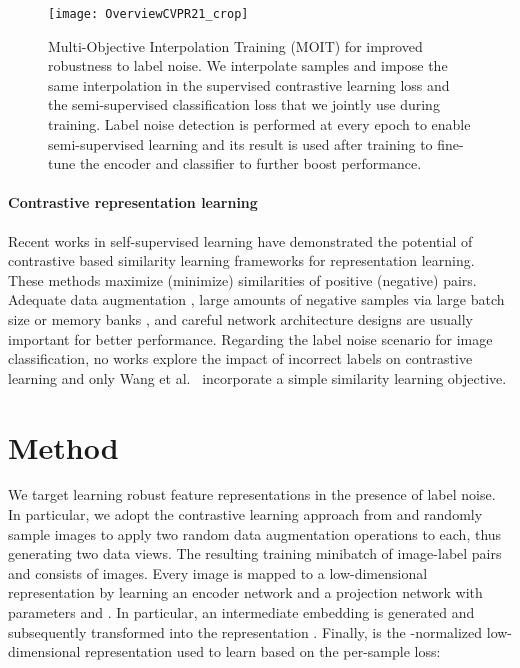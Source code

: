 \documentclass[final]{cvpr}
\begin{document}
\begin{figure*}[t]
\centering{}\texttt{[image: OverviewCVPR21\_crop]}\caption{\label{fig:Overview}Multi-Objective Interpolation Training (MOIT) for improved robustness to label noise. We interpolate samples and impose the same interpolation in the supervised contrastive learning loss  and the semi-supervised classification loss  that we jointly use during training. Label noise detection is performed at every epoch to enable semi-supervised learning and its result is used after training to fine-tune the encoder and classifier to further boost performance.}
\end{figure*}

\paragraph{Contrastive representation learning}
Recent works in self-supervised learning \cite{2020_IEEE_COntrastiveSurvey, 2020_ICML_SimCLR,2020_arXiv_SupContLearn} have demonstrated the potential of contrastive based similarity learning frameworks for representation learning. These methods maximize (minimize) similarities of positive (negative) pairs. Adequate data augmentation \cite{2020_NeurIPS_GoodViews}, large amounts of negative samples via large batch size \cite{2020_ICML_SimCLR} or memory banks \cite{2020_CVPR_MoCo,2020_CVPR_XBM}, and careful network architecture designs \cite{2020_arXiv_MoCoV2} are usually important for better performance. Regarding the label noise scenario for image classification, no works explore the impact of incorrect labels on contrastive learning and only Wang et al.~\cite{2018_CVPR_IterativeNoise}  incorporate a simple similarity learning objective.






\section{Method}


We target learning robust feature representations in the presence of label noise. In particular, we adopt the contrastive learning approach from \cite{2020_arXiv_SupContLearn} and randomly sample  images to apply two random data augmentation operations to each, thus generating two data views. The resulting training minibatch  of image-label pairs  and  consists of  images. Every image is mapped to a low-dimensional representation  by learning an encoder network  and a projection network  with parameters  and . In particular, an intermediate embedding  is
generated and subsequently transformed into the representation . Finally,  is the -normalized low-dimensional representation used to learn based on the per-sample loss:
\end{document}
